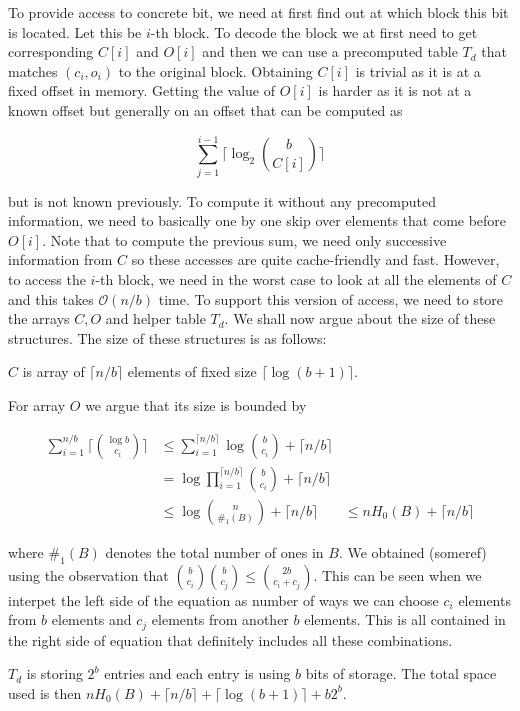 To provide access to concrete bit, we need at first find out at which block this bit is located.
Let this be $i$-th block. To decode the block we at first need to get corresponding $C[i]$ and
$O[i]$ and then we can use a precomputed table $T_d$ that matches $(c_i, o_i)$ to the original
block. Obtaining $C[i]$ is trivial as it is at a fixed offset in memory. Getting the value of
$O[i]$ is harder as it is not at a known offset but generally on an offset that can be computed
as

                $$\sum_{j=1}^{i-1} \lceil\log_2{b\choose C[i]}\rceil$$

but is not known previously. To compute it without any precomputed information,
we need to basically one by one skip over elements that come before $O[i]$.
Note that to compute the previous sum, we need only successive information from $C$ so these
accesses are quite cache-friendly and fast. However, to access the $i$-th block, we need in the
worst case to look at all the elements of $C$ and this takes $\mathcal{O}(n/b)$ time. To support
this version of access, we need to store the arrays $C, O$ and helper table $T_d$. We shall
now argue about the size of these structures. The size of these structures is
as follows:

$C$ is array of $\lceil n/b \rceil$ elements of fixed size $\lceil \log(b+1) \rceil$.

For array $O$ we argue that its size is bounded by

\begin{align*}
    \sum_{i=1}^{n/b} \bigg\lceil{\log b\choose c_i}\bigg\rceil
    &\leq \sum_{i=1}^{\lceil n/b \rceil} \log {b\choose c_i} + \lceil n/b \rceil \\
    &= \log\prod_{i=1}^{\lceil n/b \rceil} {b\choose c_i} + \lceil n/b \rceil \\
    &\leq \log{n\choose \#_1(B)} + \lceil n/b \rceil &\leq nH_0(B) + \lceil n/b \rceil
\end{align*}

where $\#_1(B)$ denotes the total number of ones in $B$. We obtained (someref) using the
observation that ${b\choose c_i} {b\choose c_j} \leq {2b\choose c_i+c_j}$. This can be seen
when we interpet the left side of the equation as number of ways we can choose $c_i$ elements
from $b$ elements and $c_j$ elements from another $b$ elements. This is all contained in the
right side of equation that definitely includes all these combinations.

$T_d$ is storing $2^b$ entries and each entry is using $b$ bits of storage.
The total space used is then $nH_0(B) +  \lceil n/b \rceil + \lceil \log(b+1) \rceil + b2^b$.

